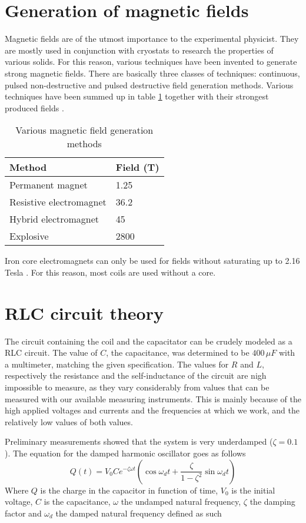 \section{Generation of magnetic fields}

Magnetic fields are of the utmost importance to the experimental physicist.  
They are mostly used in conjunction with cryostats to research the properties 
of various solids. For this reason, various techniques have been invented to 
generate strong magnetic fields. There are basically three classes of 
techniques: continuous, pulsed non-destructive and pulsed destructive field 
generation methods. Various techniques have been summed up in table 
\ref{methodTable} together with their strongest produced fields 
\cite{highPulsedMagnet} \cite{recordField}.

\begin{table}
\caption{Various magnetic field generation methods}
\label{methodTable}
\begin{tabular}{l|l}
Method & Field (T) \\
\hline
\hline
Permanent magnet & 1.25\\
Resistive electromagnet & 36.2\\
Hybrid electromagnet & 45\\
Explosive & 2800 \\
\end{tabular}
\end{table}

Iron core electromagnets can only be used for fields without saturating up to 
2.16 Tesla \cite{ironSaturation}. For this reason, most coils are used without 
a core. 

\section{RLC circuit theory}

The circuit containing the coil and the capacitator can be crudely modeled as a 
RLC circuit. The value of $C$, the capacitance, was determined to be $400\,\mu 
F$ with a multimeter, matching the given specification. The values for $R$ and 
$L$, respectively the resistance and the self-inductance of the circuit are 
nigh impossible to measure, as they vary considerably from values that can be 
measured with our available measuring instruments. This is mainly because of 
the high applied voltages and currents and the frequencies at which we work, 
and the relatively low values of both values.

Preliminary measurements showed that the system is very underdamped ($\zeta = 
0.1$). The equation for the damped harmonic oscillator goes as follows
$$
Q(t) = V_0 C e^{-\zeta \omega t} \left( \cos{\omega_d t} + \frac{\zeta} 
{1-\zeta^2} \sin{\omega_d t}\right)
$$
Where $Q$ is the charge in the capacitor in function of time, $V_0$ is the 
initial voltage, $C$ is the capacitance, $\omega$ the undamped natural 
frequency, $\zeta$ the damping factor and $\omega_d$ the damped natural 
frequency defined as such


